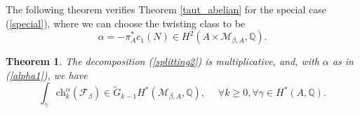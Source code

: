 \documentclass[11pt]{amsart}
\theoremstyle{plain}
\newtheorem{thm}{Theorem}[section]
\theoremstyle{definition}
\theoremstyle{remark}
\newcommand{\BQ}{{\mathbb{Q}}}
\newcommand{\CF}{{\mathcal F}}
\newcommand{\CM}{{\mathcal M}}
\begin{document}
The following theorem verifies Theorem \ref{taut_abelian} for the special case (\ref{special}), where we can choose the twisting class to be  
\begin{equation}\label{alpha1}
\alpha = - \pi_A^* c_1(N) \in H^2(A\times \CM_{\beta,A}, \BQ).
\end{equation}


\begin{thm}\label{Step1}
The decomposition (\ref{splitting2}) is multiplicative, and, with 
$\alpha$ as in  (\ref{alpha1}), we have 
\begin{equation}\label{000}
\int_\gamma \mathrm{ch}^\alpha_k(\CF_\beta) \in \widetilde{G}_{k-1} H^\ast(\CM_{\beta,A}, \BQ),\quad \; 
\forall k \geq 0, \forall\gamma \in H^\ast(A, \BQ).
\end{equation}
\end{thm}
\end{document}
